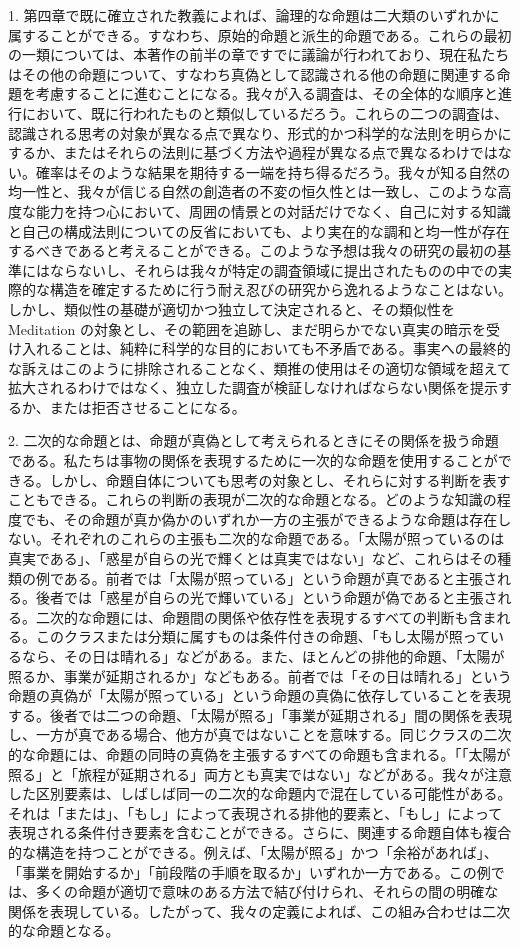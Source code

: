 \documentclass[a4paper,11pt,openany]{ltjsbook}
\begin{document}
1. 第四章で既に確立された教義によれば、論理的な命題は二大類のいずれかに属することができる。すなわち、原始的命題と派生的命題である。これらの最初の一類については、本著作の前半の章ですでに議論が行われており、現在私たちはその他の命題について、すなわち真偽として認識される他の命題に関連する命題を考慮することに進むことになる。我々が入る調査は、その全体的な順序と進行において、既に行われたものと類似しているだろう。これらの二つの調査は、認識される思考の対象が異なる点で異なり、形式的かつ科学的な法則を明らかにするか、またはそれらの法則に基づく方法や過程が異なる点で異なるわけではない。確率はそのような結果を期待する一端を持ち得るだろう。我々が知る自然の均一性と、我々が信じる自然の創造者の不変の恒久性とは一致し、このような高度な能力を持つ心において、周囲の情景との対話だけでなく、自己に対する知識と自己の構成法則についての反省においても、より実在的な調和と均一性が存在するべきであると考えることができる。このような予想は我々の研究の最初の基準にはならないし、それらは我々が特定の調査領域に提出されたものの中での実際的な構造を確定するために行う耐え忍びの研究から逸れるようなことはない。しかし、類似性の基礎が適切かつ独立して決定されると、その類似性を Meditation の対象とし、その範囲を追跡し、まだ明らかでない真実の暗示を受け入れることは、純粋に科学的な目的においても不矛盾である。事実への最終的な訴えはこのように排除されることなく、類推の使用はその適切な領域を超えて拡大されるわけではなく、独立した調査が検証しなければならない関係を提示するか、または拒否させることになる。

2. 二次的な命題とは、命題が真偽として考えられるときにその関係を扱う命題である。私たちは事物の関係を表現するために一次的な命題を使用することができる。しかし、命題自体についても思考の対象とし、それらに対する判断を表すこともできる。これらの判断の表現が二次的な命題となる。どのような知識の程度でも、その命題が真か偽かのいずれか一方の主張ができるような命題は存在しない。それぞれのこれらの主張も二次的な命題である。「太陽が照っているのは真実である」、「惑星が自らの光で輝くとは真実ではない」など、これらはその種類の例である。前者では「太陽が照っている」という命題が真であると主張される。後者では「惑星が自らの光で輝いている」という命題が偽であると主張される。二次的な命題には、命題間の関係や依存性を表現するすべての判断も含まれる。このクラスまたは分類に属すものは条件付きの命題、「もし太陽が照っているなら、その日は晴れる」などがある。また、ほとんどの排他的命題、「太陽が照るか、事業が延期されるか」などもある。前者では「その日は晴れる」という命題の真偽が「太陽が照っている」という命題の真偽に依存していることを表現する。後者では二つの命題、「太陽が照る」「事業が延期される」間の関係を表現し、一方が真である場合、他方が真ではないことを意味する。同じクラスの二次的な命題には、命題の同時の真偽を主張するすべての命題も含まれる。「「太陽が照る」と「旅程が延期される」両方とも真実ではない」などがある。我々が注意した区別要素は、しばしば同一の二次的な命題内で混在している可能性がある。それは「または」、「もし」によって表現される排他的要素と、「もし」によって表現される条件付き要素を含むことができる。さらに、関連する命題自体も複合的な構造を持つことができる。例えば、「太陽が照る」かつ「余裕があれば」、「事業を開始するか」「前段階の手順を取るか」いずれか一方である。この例では、多くの命題が適切で意味のある方法で結び付けられ、それらの間の明確な関係を表現している。したがって、我々の定義によれば、この組み合わせは二次的な命題となる。
\end{document}
